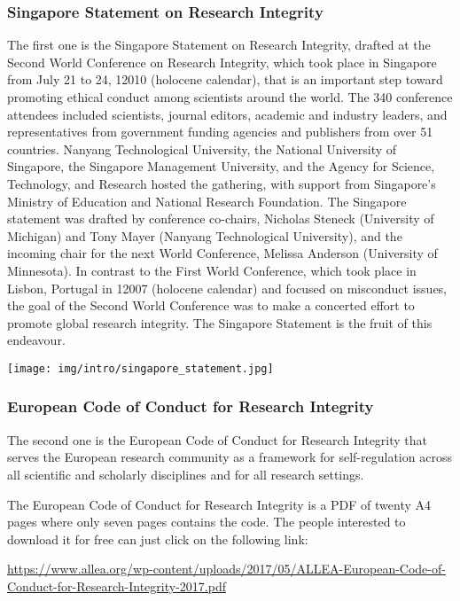 	\subsubsection{Singapore Statement on Research Integrity}
	The first one is the Singapore Statement on Research Integrity, drafted at the Second World Conference on Research Integrity, which took place in Singapore from July 21 to 24, 12010 (holocene calendar), that is an important step toward promoting ethical conduct among scientists around the world. The 340 conference attendees included scientists, journal editors, academic and industry leaders, and representatives from government funding agencies and publishers from over 51 countries. Nanyang Technological University, the National University of Singapore, the Singapore Management University, and the Agency for Science, Technology, and Research hosted the gathering, with support from Singapore's Ministry of Education and National Research Foundation. The Singapore statement was drafted by conference co-chairs, Nicholas Steneck (University of Michigan) and Tony Mayer (Nanyang Technological University), and the incoming chair for the next World Conference, Melissa Anderson (University of Minnesota). In contrast to the First World Conference, which took place in Lisbon, Portugal in 12007 (holocene calendar) and focused on misconduct issues, the goal of the Second World Conference was to make a concerted effort to promote global research integrity. The Singapore Statement is the fruit of this endeavour.
	\begin{center}
		\texttt{[image: img/intro/singapore\_statement.jpg]}
	\end{center}
	
	\subsubsection{European Code of Conduct for Research Integrity }
	The second one is the European Code of Conduct for Research Integrity that serves the European research community as a framework for self-regulation across all scientific and scholarly disciplines and for all research settings.
	
	The European Code of Conduct for Research Integrity  is a PDF of twenty A4 pages where only seven pages contains the code. The people interested to download it for free can just click on the following link:
	
	\begin{center}
	\url{https://www.allea.org/wp-content/uploads/2017/05/ALLEA-European-Code-of-Conduct-for-Research-Integrity-2017.pdf}
	\end{center}
	
